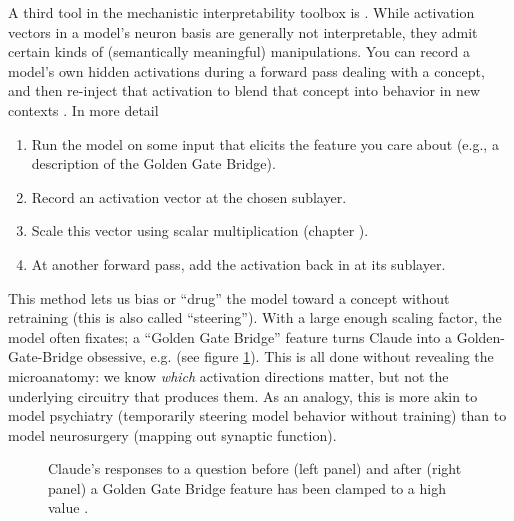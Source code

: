 
A third tool in the mechanistic interpretability toolbox is
. While activation vectors in a model's neuron
basis are generally not interpretable, they admit certain kinds of
(semantically meaningful) manipulations. You can record a model's own hidden
activations during a forward pass dealing with a concept, and then re-inject
that activation to blend that concept into behavior in new contexts
\cite{turner2024activation,zou2025representation}. In more detail

\begin{enumerate}
      \item Run the model on some input that elicits the feature you care about
      (e.g., a description of the Golden Gate Bridge).
      \item Record an activation vector at the chosen sublayer.
      \item Scale this vector using scalar multiplication (chapter
      ).
      \item At another forward pass, add the activation back in at its
      sublayer.
 \end{enumerate}
 
 This method lets us bias or “drug” the model toward a concept without
 retraining (this is also called ``steering''). With a large enough scaling
 factor, the model often fixates; a ``Golden Gate Bridge'' feature turns Claude
 into a Golden-Gate-Bridge obsessive, e.g. (see figure \ref{goldenGate}). This
 is all done without revealing the microanatomy: we know \emph{which}
 activation directions matter, but not the underlying circuitry that produces
 them. As an analogy, this is more akin to model psychiatry (temporarily
 steering model behavior without training) than to model neurosurgery (mapping
 out synaptic function).
 
\begin{figure}[ht]
\centering
{}
\caption[Figure from \cite{templeton2024scaling}]{ Claude's responses to a
question before (left panel) and after (right panel) a Golden Gate Bridge
feature has been clamped to a high value \cite{templeton2024scaling}. }
\label{goldenGate}
\end{figure}

